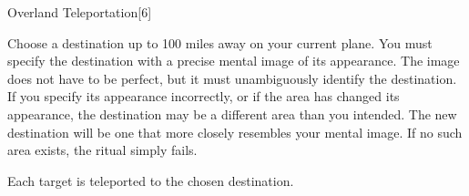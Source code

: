 \begin{spellsection}{Overland Teleportation}[6]

\begin{spellcontent}

\begin{spelltargetinginfo}



\end{spelltargetinginfo}


\begin{spelleffects}
\spellspecial
Choose a destination up to 100 miles away on your current plane.
You must specify the destination with a precise mental image of its appearance.
The image does not have to be perfect, but it must unambiguously identify the destination.
If you specify its appearance incorrectly, or if the area has changed its appearance, the destination may be a different area than you intended.
The new destination will be one that more closely resembles your mental image.
If no such area exists, the ritual simply fails.



\spelleffect
Each target is teleported to the chosen destination.








\end{spelleffects}

\end{spellcontent}
\begin{spellfooter}


\end{spellfooter}
\begin{spellsubcontent}


\end{spellsubcontent}
\end{spellsection}



